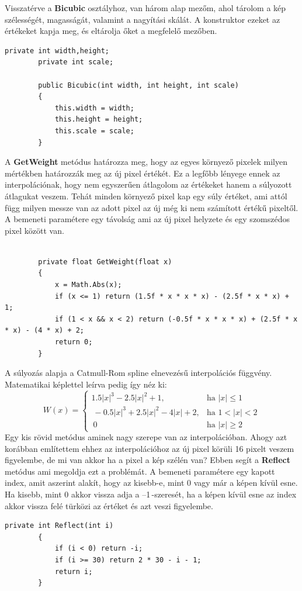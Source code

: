 \documentclass[]{thesis-ekf}
\theoremstyle{definition}
\theoremstyle{remark}
\begin{document}
	Visszatérve a \textbf{Bicubic} osztályhoz, van három alap mezőm, ahol tárolom a kép szélességét, magasságát, valamint a nagyítási skálát. A konstruktor ezeket az értékeket kapja meg, és eltárolja őket a megfelelő mezőben.
	\begin{lstlisting}[language=CSharp]
		private int width,height;
		private int scale;
		
		public Bicubic(int width, int height, int scale)
		{
			this.width = width;
			this.height = height;
			this.scale = scale;
		}
	\end{lstlisting}
	A \textbf{GetWeight} metódus határozza meg, hogy az egyes környező pixelek milyen mértékben határozzák meg az új pixel értékét. Ez a legfőbb lényege ennek az interpolációnak, hogy nem egyszerűen átlagolom az értékeket hanem a súlyozott átlagukat veszem. Tehát minden környező pixel kap egy súly értéket, ami attól függ milyen messze van az adott pixel az új még ki nem számított értékű pixeltől. A bemeneti paramétere egy távolság ami az új pixel helyzete és egy szomszédos pixel között van.
	\begin{lstlisting}[language=CSharp]
		
		private float GetWeight(float x)
		{
			x = Math.Abs(x);
			if (x <= 1) return (1.5f * x * x * x) - (2.5f * x * x) + 1;
			if (1 < x && x < 2) return (-0.5f * x * x * x) + (2.5f * x * x) - (4 * x) + 2;
			return 0;
		}
	\end{lstlisting}
	A súlyozás alapja a Catmull-Rom spline\cite{catmull-rom_spline} elnevezésű interpolációs függvény. Matematikai képlettel leírva pedig így néz ki:
	\[
	W(x) = 
	\begin{cases}
		1.5|x|^3 - 2.5|x|^2 + 1, & \text{ha } |x| \leq 1 \\\
		-0.5|x|^3 + 2.5|x|^2 - 4|x| + 2, & \text{ha } 1 < |x| < 2 \\\
		0 & \text{ha } |x| \geq 2
	\end{cases}
	\]
	Egy kis rövid metódus aminek nagy szerepe van az interpolációban. Ahogy azt korábban említettem ehhez az interpolációhoz az új pixel körüli 16 pixelt veszem figyelembe, de mi van akkor ha a pixel a kép szélén van? Ebben segít a \textbf{Reflect} metódus ami megoldja ezt a problémát. A bemeneti paramétere egy kapott index, amit aszerint alakít, hogy az kisebb-e, mint 0 vagy már a képen kívül esne. Ha kisebb, mint 0 akkor vissza adja a --1\,-szeresét, ha a képen kívül esne az index akkor vissza felé türközi az értéket és azt veszi figyelembe.
	\begin{lstlisting}[language=CSharp]
		private int Reflect(int i)
		{
			if (i < 0) return -i;
			if (i >= 30) return 2 * 30 - i - 1;
			return i;
		}
	\end{lstlisting}
\end{document}
